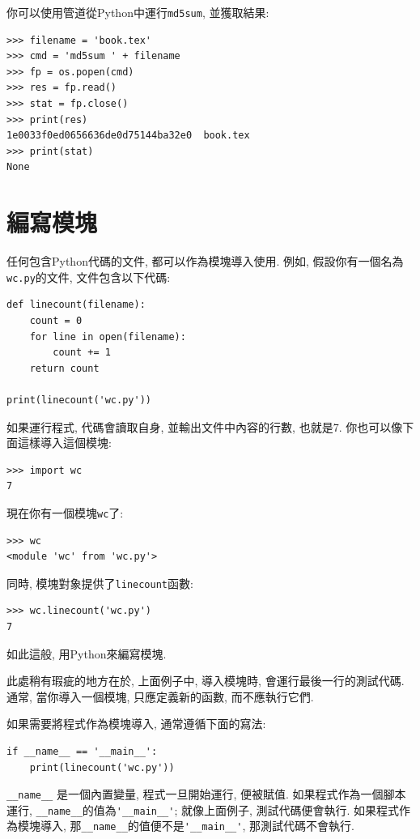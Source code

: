 \documentclass[10pt]{book}
\begin{document}
你可以使用管道從Python中運行{\tt md5sum}, 並獲取結果:

\begin{verbatim}
>>> filename = 'book.tex'
>>> cmd = 'md5sum ' + filename
>>> fp = os.popen(cmd)
>>> res = fp.read()
>>> stat = fp.close()
>>> print(res)
1e0033f0ed0656636de0d75144ba32e0  book.tex
>>> print(stat)
None
\end{verbatim}



\section{編寫模塊}
\label{modules}
任何包含Python代碼的文件, 都可以作為模塊導入使用. 
例如, 假設你有一個名為{\tt wc.py}的文件, 文件包含以下代碼:

\begin{verbatim}
def linecount(filename):
    count = 0
    for line in open(filename):
        count += 1
    return count

print(linecount('wc.py'))
\end{verbatim}
%
如果運行程式, 代碼會讀取自身, 並輸出文件中內容的行數, 也就是7.
你也可以像下面這樣導入這個模塊:

\begin{verbatim}
>>> import wc
7
\end{verbatim}
%
現在你有一個模塊{\tt wc}了:

\begin{verbatim}
>>> wc
<module 'wc' from 'wc.py'>
\end{verbatim}
%
同時, 模塊對象提供了\verb"linecount"函數:

\begin{verbatim}
>>> wc.linecount('wc.py')
7
\end{verbatim}
%
如此這般, 用Python來編寫模塊. 

此處稍有瑕疵的地方在於, 上面例子中, 導入模塊時, 
會運行最後一行的測試代碼. 
通常, 當你導入一個模塊, 只應定義新的函數, 而不應執行它們.

如果需要將程式作為模塊導入, 通常遵循下面的寫法:

\begin{verbatim}
if __name__ == '__main__':
    print(linecount('wc.py'))
\end{verbatim}
%
\verb"__name__" 是一個內置變量, 程式一旦開始運行, 便被賦值. 
如果程式作為一個腳本運行, \verb"__name__"的值為\verb"'__main__'";
就像上面例子, 測試代碼便會執行. 
如果程式作為模塊導入, 那\verb"__name__"的值便不是\verb"'__main__'", 
那測試代碼不會執行. 
\end{document}
